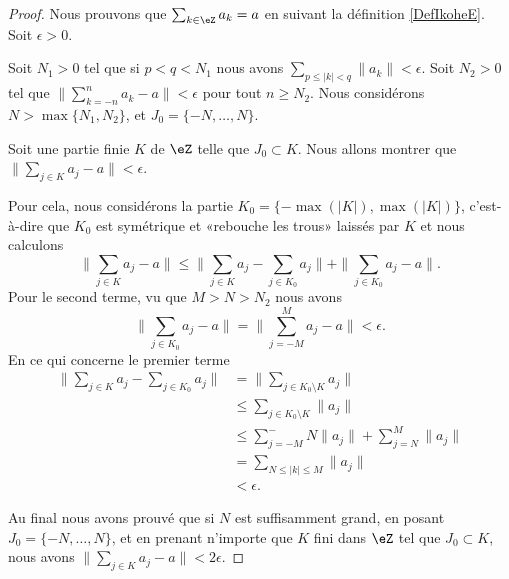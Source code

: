 \begin{proof}
	Nous prouvons que \( \sum_{k\in \eZ}a_k=a\) en suivant la définition \ref{DefIkoheE}. Soit \( \epsilon>0\).

	Soit \( N_1>0\) tel que si \( p<q<N_1\) nous avons \( \sum_{p\leq | k |<q}\| a_k \|<\epsilon\). Soit \( N_2>0\) tel que \( \| \sum_{k=-n}^{n}a_k-a \|<\epsilon\) pour tout \( n\geq N_2\). Nous considérons \( N>\max\{ N_1,N_2 \}\), et \( J_0=\{ -N,\ldots,N \}\).

	Soit une partie finie \( K\) de \( \eZ\) telle que \( J_0\subset K\). Nous allons montrer que \( \| \sum_{j\in K}a_j-a \|<\epsilon\).

	Pour cela, nous considérons la partie \( K_0=\{ -\max(| K |),\max(| K |) \}\), c'est-à-dire que \( K_0\) est symétrique et «rebouche les trous» laissés par \( K\) et nous calculons
	\begin{equation}
		\| \sum_{j\in K}a_j-a \|  \leq \| \sum_{j\in K}a_j-\sum_{j\in K_0}a_j \|+\| \sum_{j\in K_0}a_j-a \|.
	\end{equation}
	Pour le second terme, vu que \( M>N>N_2\) nous avons
	\begin{equation}
		\| \sum_{j\in K_0}a_j-a \|=\| \sum_{j=-M}^Ma_j-a \|<\epsilon.
	\end{equation}
	En ce qui concerne le premier terme
	\begin{subequations}
		\begin{align}
			\| \sum_{j\in K}a_j-\sum_{j\in K_0}a_j \| & =\| \sum_{j\in K_0\setminus K}a_j \|               \\
			                                          & \leq\sum_{j\in K_0\setminus K}\| a_j \|            \\
			                                          & \leq \sum_{j=-M}^-N\| a_j \|+\sum_{j=N}^M\| a_j \| \\
			                                          & =\sum_{N\leq | k |\leq M}\| a_j \|                 \\
			                                          & <\epsilon.
		\end{align}
	\end{subequations}

	Au final nous avons prouvé que si \( N\) est suffisamment grand, en posant \( J_0=\{ -N,\ldots,N \}\), et en prenant n'importe que \( K\) fini dans \( \eZ\) tel que \( J_0\subset K\), nous avons \( \| \sum_{j\in K}a_j-a \|<2\epsilon\).
\end{proof}


